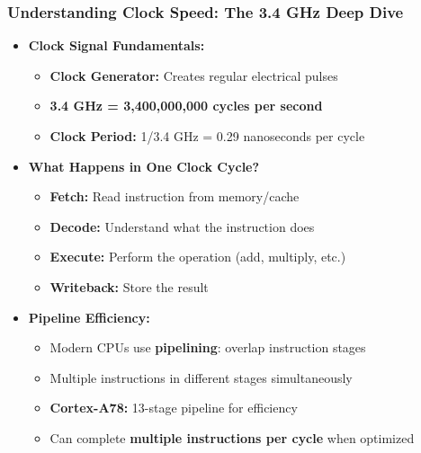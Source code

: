 \begin{frame}
\frametitle{Understanding Clock Speed: The 3.4 GHz Deep Dive}
\begin{itemize}
    \item \textbf{Clock Signal Fundamentals:}
    \begin{itemize}
        \item \textbf{Clock Generator:} Creates regular electrical pulses
        \item \textbf{3.4 GHz = 3,400,000,000 cycles per second}
        \item \textbf{Clock Period:} 1/3.4 GHz = 0.29 nanoseconds per cycle
    \end{itemize}
    \item \textbf{What Happens in One Clock Cycle?}
    \begin{itemize}
        \item \textbf{Fetch:} Read instruction from memory/cache
        \item \textbf{Decode:} Understand what the instruction does
        \item \textbf{Execute:} Perform the operation (add, multiply, etc.)
        \item \textbf{Writeback:} Store the result
    \end{itemize}
    \item \textbf{Pipeline Efficiency:}
    \begin{itemize}
        \item Modern CPUs use \textbf{pipelining}: overlap instruction stages
        \item Multiple instructions in different stages simultaneously
        \item \textbf{Cortex-A78:} 13-stage pipeline for efficiency
        \item Can complete \textbf{multiple instructions per cycle} when optimized
    \end{itemize}
\end{itemize}
\end{frame}


